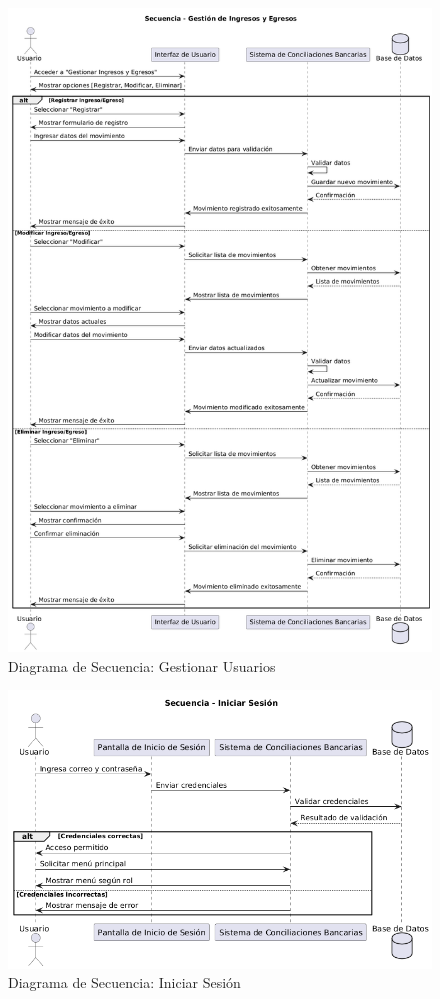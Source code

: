 \documentclass{article}
\begin{document}
\begin{figure}[H]
    \centering
    \includegraphics[width=\textwidth]{secuencia/IngresosEgresos.png}
    \caption{Diagrama de Secuencia: Gestionar Usuarios}
\end{figure}

\begin{figure}[H]
    \centering
    \includegraphics[width=\textwidth]{secuencia/IniciarSesion.png}
    \caption{Diagrama de Secuencia: Iniciar Sesión}
\end{figure}
\end{document}
